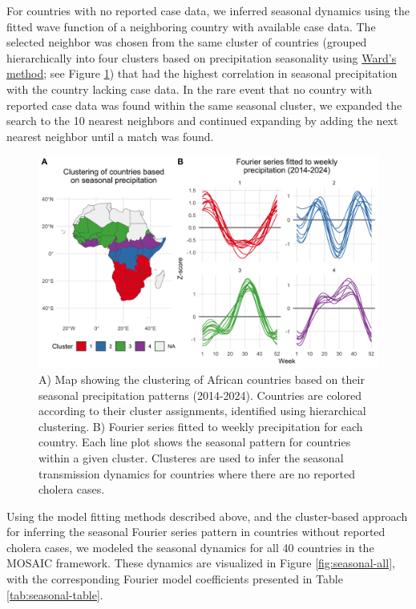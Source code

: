 \documentclass[
]{book}
\begin{document}
For countries with no reported case data, we inferred seasonal dynamics using the fitted wave function of a neighboring country with available case data. The selected neighbor was chosen from the same cluster of countries (grouped hierarchically into four clusters based on precipitation seasonality using \href{https://en.wikipedia.org/wiki/Ward\%27s_method}{Ward's method}; see Figure \ref{fig:seasonal-cluster}) that had the highest correlation in seasonal precipitation with the country lacking case data. In the rare event that no country with reported case data was found within the same seasonal cluster, we expanded the search to the 10 nearest neighbors and continued expanding by adding the next nearest neighbor until a match was found.

\begin{figure}

{\centering \includegraphics[width=1\linewidth]{figures/seasonal_precip_ward.D2_cluster} 

}

\caption{A) Map showing the clustering of African countries based on their seasonal precipitation patterns (2014-2024). Countries are colored according to their cluster assignments, identified using hierarchical clustering. B) Fourier series fitted to weekly precipitation for each country. Each line plot shows the seasonal pattern for countries within a given cluster. Clusteres are used to infer the seasonal transmission dynamics for countries where there are no reported cholera cases.}\label{fig:seasonal-cluster}
\end{figure}

Using the model fitting methods described above, and the cluster-based approach for inferring the seasonal Fourier series pattern in countries without reported cholera cases, we modeled the seasonal dynamics for all 40 countries in the MOSAIC framework. These dynamics are visualized in Figure \ref{fig:seasonal-all}, with the corresponding Fourier model coefficients presented in Table \ref{tab:seasonal-table}.
\end{document}
